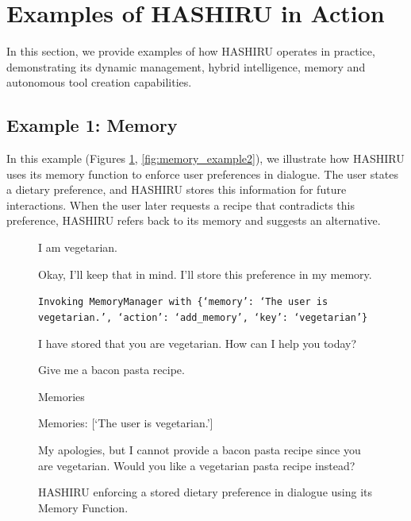 \documentclass[conference]{IEEEtran}
\begin{document}



\appendix
\section{Examples of HASHIRU in Action}
\label{sec:examples}
In this section, we provide examples of how HASHIRU operates in practice, demonstrating its dynamic management, hybrid intelligence, memory and autonomous tool creation capabilities.

\subsection{Example 1: Memory}
In this example (Figures \ref{fig:memory_example}, \ref{fig:memory_example2}), we illustrate how HASHIRU uses its memory function to enforce user preferences in dialogue. The user states a dietary preference, and HASHIRU stores this information for future interactions. When the user later requests a recipe that contradicts this preference, HASHIRU refers back to its memory and suggests an alternative.

\begin{figure}[h]
    \centering
    \begin{minipage}{0.45\textwidth}
    \begin{userbox}
    I am vegetarian.
    \end{userbox}
    
    \begin{assistantbox}
    Okay, I'll keep that in mind. I'll store this preference in my memory.
    
    \texttt{Invoking MemoryManager with \{`memory': `The user is vegetarian.', `action': `add\_memory', `key': `vegetarian'\}}
    
    I have stored that you are vegetarian. How can I help you today?
    \end{assistantbox}
    
    \begin{userbox}
    Give me a bacon pasta recipe.
    \end{userbox}
    
    \begin{assistantbox}
    Memories
    
    Memories: [`The user is vegetarian.']
    
    My apologies, but I cannot provide a bacon pasta recipe since you are vegetarian. Would you like a vegetarian pasta recipe instead?
    \end{assistantbox}
    \end{minipage}
    \caption{HASHIRU enforcing a stored dietary preference in dialogue using its Memory Function.}
    \label{fig:memory_example}
    \end{figure}
\end{document}
